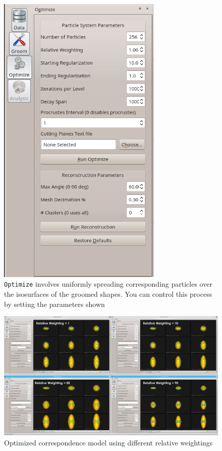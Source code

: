 \documentclass[letterpaper,12pt]{article}   %
\begin{document}
\begin{figure}[!htp]
	\begin{minipage}[c]{0.5\textwidth}
		\centering
		\includegraphics[width=0.7\textwidth]{figs_v2/optimize.png}
	\end{minipage}\hfill
	\begin{minipage}[t]{0.5\textwidth}
		\centering
		\caption{\texttt{Optimize} involves uniformly spreading corresponding particles over the isosurfaces of the groomed shapes. You can control this process by setting the parameters shown } 
		\label{fig:optimize}
	\end{minipage}
\end{figure}


\begin{figure}[!htp]
	\centering
	\includegraphics[width=1\textwidth]{figs_v2/ellipsoid_relative_weighting.png}
	\caption{Optimized correspondence model using different relative weightings}
	\label{fig:ellipsoid_relative_weighting}
\end{figure}
\end{document}
